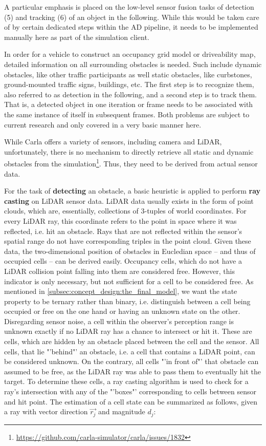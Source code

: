 A particular emphasis is placed on the low-level sensor fusion tasks of detection (5) and tracking (6) of an object in the following. While this would be taken care of by certain dedicated steps within the AD pipeline, it needs to be implemented manually here as part of the simulation client.

In order for a vehicle to construct an occupancy grid model or driveability map, detailed information on all surrounding obstacles is needed. Such include dynamic obstacles, like other traffic participants as well static obstacles, like curbstones, ground-mounted traffic signs, buildings, etc. The first step is to recognize them, also referred to as detection in the following, and a second step is to track them. That is, a detected object in one iteration or frame needs to be associated with the same instance of itself in subsequent frames. Both problems are subject to current research and only covered in a very basic manner here.

While Carla offers a variety of sensors, including camera and LiDAR, unfortunately, there is no mechanism to directly retrieve all static and dynamic obstacles from the simulation\footnote{\url{https://github.com/carla-simulator/carla/issues/1832}}. Thus, they need to be derived from actual sensor data. 
\par
\bigskip

For the task of \textbf{detecting} an obstacle, a basic heuristic is applied to  perform \textbf{ray casting} on LiDAR sensor data. LiDAR data usually exists in the form of point clouds, which are, essentially, collections of 3-tuples of world coordinates. For every LiDAR ray, this coordinate refers to the point in space where it was reflected, i.e. hit an obstacle. Rays that are not reflected within the sensor's spatial range do not have corresponding triples in the point cloud. Given these data, the two-dimensional position of obstacles in Eucledian space – and thus of occupied cells – can be derived easily. Occupancy cells, which do not have a LiDAR collision point falling into them are considered free. However, this indicator is only necessary, but not sufficient for a cell to be considered free. As mentioned in \autoref{subsec:concept_design:the_final_model}, we want the state property to be ternary rather than binary, i.e. distinguish between a cell being occupied or free on the one hand or having an unknown state on the other. Disregarding sensor noise, a cell within the observer's perception range is unknown exactly if no LiDAR ray has a chance to intersect or hit it. These are cells, which are hidden by an obstacle placed between the cell and the sensor. All cells, that lie "'behind"' an obstacle, i.e. a cell that contains a LiDAR point, can be considered unknown. On the contrary, all cells "'in front of"' that obstacle can assumed to be free, as the LiDAR ray was able to pass them to eventually hit the target. To determine these cells, a ray casting algorithm is used to check for a ray's intersection with any of the "'boxes"' corresponding to cells between sensor and hit point. The estimation of a cell state can be summarized as follows, given a ray with vector direction $\vec{r_j}$ and magnitude $d_j$:

